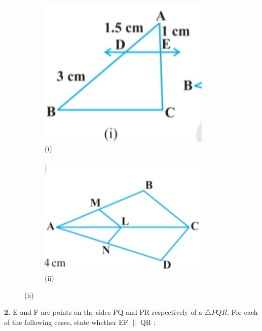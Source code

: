 \documentclass[a4paper,12pt]{article}
\begin{document}
\begin{figure}[h!]
\centering
\begin{subfigure}{0.45\textwidth}
    \centering
    \includegraphics[width=0.9\textwidth]{a0.jpg}
    \caption*{(i)}
\end{subfigure}
\hfill
\begin{subfigure}{0.45\textwidth}
    \centering
    \includegraphics[width=0.9\textwidth]{a1.jpg}
    \caption*{(ii)}
\end{subfigure}
\end{figure}

\vspace{1em}

\textbf{2.} E and F are points on the sides PQ and PR respectively of a $\triangle PQR$. For each of the following cases, state whether EF $\parallel$ QR :
\end{document}
